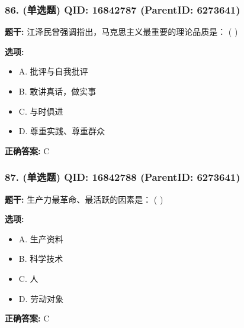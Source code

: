 \documentclass[12pt,UTF8]{ctexart}
\begin{document}
\vspace{0.3em}\hrulefill\vspace{0.7em}

\subsubsection*{86. (单选题) \small QID: 16842787 (ParentID: 6273641)}

\textbf{题干:}
江泽民曾强调指出，马克思主义最重要的理论品质是： ( )



\textbf{选项:}
\begin{itemize}[leftmargin=*]

  \item A. 批评与自我批评

  \item B. 敢讲真话，做实事

  \item C. 与时俱进

  \item D. 尊重实践、尊重群众

\end{itemize}

\textbf{正确答案:}
C

\vspace{0.3em}\hrulefill\vspace{0.7em}

\subsubsection*{87. (单选题) \small QID: 16842788 (ParentID: 6273641)}

\textbf{题干:}
生产力最革命、最活跃的因素是： ( )



\textbf{选项:}
\begin{itemize}[leftmargin=*]

  \item A. 生产资料

  \item B. 科学技术

  \item C. 人

  \item D. 劳动对象

\end{itemize}

\textbf{正确答案:}
C

\vspace{0.3em}\hrulefill\vspace{0.7em}
\end{document}
